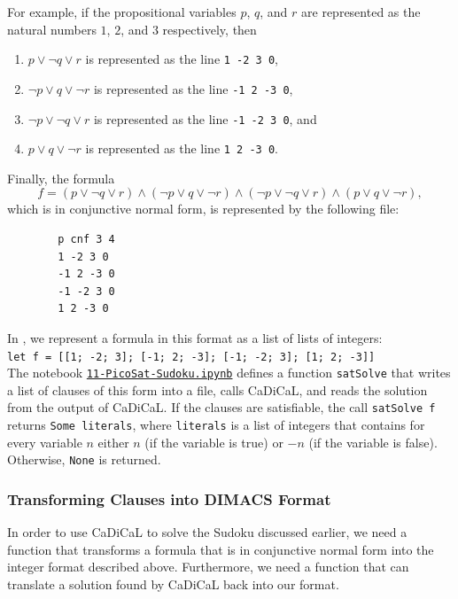 For example, if the propositional variables $p$, $q$, and $r$ are represented as the natural numbers
$1$, $2$, and $3$ respectively, then
\begin{enumerate}
\item $p \vee \neg q \vee r$ is represented as the line \texttt{1 -2 3 0},
\item $\neg p \vee q \vee \neg r$ is represented as the line \texttt{-1 2 -3 0},
\item $\neg p \vee \neg q \vee r$ is represented as the line \texttt{-1 -2 3 0}, and
\item $p \vee q \vee \neg r$ is represented as the line \texttt{1 2 -3 0}.
\end{enumerate}
Finally, the formula 
$$ f = (p \vee \neg q \vee r) \wedge (\neg p \vee q \vee \neg r) \wedge (\neg p \vee \neg q \vee r) \wedge (p \vee q \vee \neg r), $$
which is in conjunctive normal form, is represented by the following file:
\begin{verbatim}
        p cnf 3 4
        1 -2 3 0
        -1 2 -3 0
        -1 -2 3 0
        1 2 -3 0
\end{verbatim}
In \Fsharp, we represent a formula in this format as a list of lists of integers:
\\[0.2cm]
\hspace*{1.3cm}
\texttt{let f = [[1; -2; 3]; [-1; 2; -3]; [-1; -2; 3]; [1; 2; -3]]}
\\[0.2cm]
The notebook
\href{https://github.com/karlstroetmann/Logic/blob/master/F-Sharp/Chapter-4/11-PicoSat-Sudoku.ipynb}{\texttt{11-PicoSat-Sudoku.ipynb}}
defines a function \texttt{satSolve} that writes a list of clauses of this form into a file, calls CaDiCaL,
and reads the solution from the output of CaDiCaL.  If the clauses are satisfiable, the call
\texttt{satSolve f} returns \texttt{Some literals}, where \texttt{literals} is a list of integers that contains
for every variable $n$ either $n$ (if the variable is true) or $-n$ (if the variable is false).  Otherwise,
\texttt{None} is returned.

\pagebreak
\subsubsection{Transforming Clauses into DIMACS Format}
In order to use CaDiCaL to solve the Sudoku discussed earlier, we need a function that transforms a
formula that is in conjunctive normal form into the integer format described above.  Furthermore, we need a
function that can translate a solution found by CaDiCaL back into our format.

